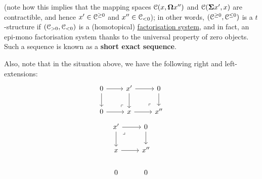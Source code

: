 \begin{definition}[t-structures]
\begin{enumerate}
\begin{enumerate}
$$                                    $$
                                (note how this implies that the mapping spaces $\mathcal{C}(x, \mathbf{\Omega} x'')$ and $\mathcal{C}(\mathbf{\Sigma} x', x)$ are contractible, and hence $x' \in \mathcal{C}^{\geq 0}$ and $x'' \in \mathcal{C}_{< 0}$); in other words, $(\mathcal{C}^{\geq 0}, \mathcal{C}^{\leq 0})$ is a $t$-structure if $(\mathcal{C}_{> 0}, \mathcal{C}_{< 0})$ is a (homotopical) \href{https://ncatlab.org/joyalscatlab/published/Factorisation+systems}{\underline{factorisation system}}, and in fact, an epi-mono factorisation system thanks to the universal property of zero objects. Such a sequence is known as a \textbf{short exact sequence}. 
                                
                                Also, note that in the situation above, we have the following right and left-extensions:
                                    $$
                                        \begin{tikzcd}
                                        	0 & {x'} & 0 \\
                                        	0 & x & {x''}
                                        	\arrow[from=1-3, to=2-3]
                                        	\arrow[from=2-2, to=2-3]
                                        	\arrow[from=1-2, to=2-2]
                                        	\arrow[from=1-2, to=1-3]
                                        	\arrow["\lrcorner"{anchor=center, pos=0.125, rotate=180}, draw=none, from=2-3, to=1-2]
                                        	\arrow[from=1-1, to=2-1]
                                        	\arrow[from=2-1, to=2-2]
                                        	\arrow[from=1-1, to=1-2]
                                        	\arrow["\lrcorner"{anchor=center, pos=0.125, rotate=180}, draw=none, from=2-2, to=1-1]
                                        \end{tikzcd}
                                    $$
                                    $$
                                        \begin{tikzcd}
                                        	{x'} & 0 \\
                                        	x & {x''} \\
                                        	0 & 0
                                        	\arrow[from=1-2, to=2-2]
                                        	\arrow[from=2-1, to=2-2]
                                        	\arrow[from=1-1, to=2-1]
                                        	\arrow[from=1-1, to=1-2]
                                        	\arrow["\lrcorner"{anchor=center, pos=0.125}, draw=none, from=1-1, to=2-2]

\end{tikzcd}$$
\end{enumerate}
\end{enumerate}
\end{definition}
